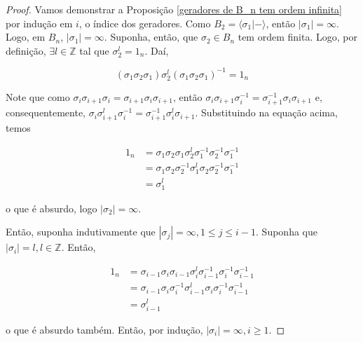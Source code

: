 \documentclass[a4paper,portuguese,11pt,twoside, leqno]{book}
\theoremstyle{definition}
\begin{document}
	\begin{proof}
		Vamos demonstrar a Proposição \eqref{geradores de B_n tem ordem infinita} por indução em $i$, o índice dos geradores.	Como $B_2 = \langle \sigma_1 | - \rangle$, então $|\sigma_1| = \infty$. Logo, em $B_n$, $|\sigma_1| = \infty$. Suponha, então, que $\sigma_2\in B_n$ tem ordem finita. Logo, por definição, $\exists l\in\mathbb{Z}$ tal que $\sigma_2^l = 1_n$. Daí, 
		
		\begin{equation*}
		(\sigma_1\sigma_2\sigma_1)\sigma_2^l(\sigma_1\sigma_2\sigma_1)^{-1} = 1_n
		\end{equation*}
		
		\par\vspace{0.3cm} Note que como $\sigma_i\sigma_{i+1}\sigma_i = \sigma_{i+1}\sigma_i\sigma_{i+1}$, então $\sigma_i\sigma_{i+1}\sigma_i^{-1} = \sigma_{i+1}^{-1}\sigma_i\sigma_{i+1}$ e, consequentemente, $\sigma_i\sigma_{i+1}^l\sigma_i^{-1} = \sigma_{i+1}^{-1}\sigma_i^l\sigma_{i+1}$. Substituindo na equação acima, temos
		
		\begin{align*}
		1_n &= \sigma_1\sigma_2\sigma_1\sigma_2^l\sigma_1^{-1}\sigma_2^{-1}\sigma_1^{-1} \\
		&= \sigma_1\sigma_2\sigma_2^{-1}\sigma_1^l\sigma_2\sigma_2^{-1}\sigma_1^{-1} \\
		&= \sigma_1^l
		\end{align*}
		
		\par\vspace{0.3cm} o que é absurdo, logo $|\sigma_2| = \infty$.
		
		\par\vspace{0.3cm} Então, suponha indutivamente que $|\sigma_j| = \infty, 1\leq j\leq i-1$. Suponha que $|\sigma_i| = l, l\in\mathbb{Z}$. Então, 
		
		\begin{align*}
		1_n &= \sigma_{i-1}\sigma_i\sigma_{i-1}\sigma_i^l\sigma_{i-1}^{-1}\sigma_i^{-1}\sigma_{i-1}^{-1} \\
		&= \sigma_{i-1}\sigma_i\sigma_i^{-1}\sigma_{i-1}^l\sigma_i\sigma_i^{-1}\sigma_{i-1}^{-1} \\
		&= \sigma_{i-1}^l
		\end{align*}
		
		\par\vspace{0.3cm} o que é absurdo também. Então, por indução, $|\sigma_i| = \infty, i\geq 1$. 
	\end{proof}
	
\end{document}
